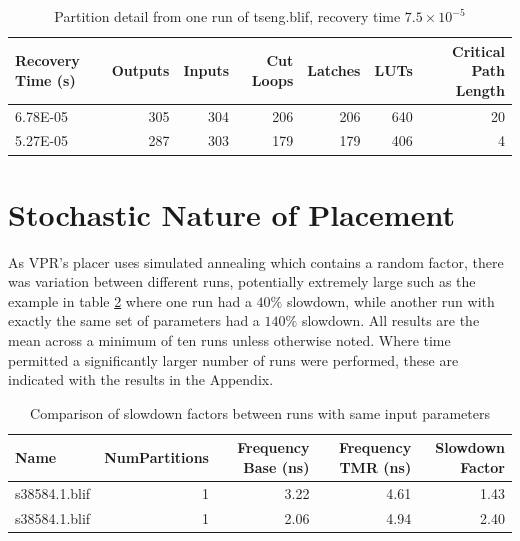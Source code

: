 \documentclass[12pt,final,oneside]{dwThesis} %
\begin{document}
   \begin{table}

      \begin{tabular}
         {lrrrrrr} \toprule Recovery Time (s) &
         Outputs & Inputs & Cut Loops & Latches & \glspl{LUT} & Critical
         Path Length\\
         \midrule 6.78E-05 & 305 & 304 & 206 & 206 & 640 &
         20\\
         5.27E-05 & 287 & 303 & 179 & 179 & 406 & 4\\
         \bottomrule

      \end{tabular}
      \caption{Partition detail from one run of tseng.blif,
         recovery time $7.5\times10^{-5}$}\label{tabSanityPartitions}

   \end{table}



   \section{Stochastic Nature of Placement}\label{stochastic}
   As \gls{VPR}'s placer uses
   simulated annealing which contains a random factor, there was variation
   between different runs, potentially extremely large such as the example in
   table \ref{tabStochastic} where one run had a $40\%$ slowdown, while another
   run with exactly the same set of parameters had a $140\%$ slowdown.
   All results are the mean across a minimum of ten runs unless otherwise noted.
   Where time permitted a significantly larger number of runs were performed, these are indicated with the results in the Appendix.

   \begin{table}

      \begin{tabular}
         {lrrrr} \toprule Name & NumPartitions &
         Frequency Base (ns) & Frequency TMR (ns) & Slowdown Factor\\
         \midrule
         s38584.1.blif &	1 & 3.22 & 4.61 & 1.43\\
         s38584.1.blif &	1 & 2.06 &
         4.94 & 2.40\\
         \bottomrule 
      \end{tabular}
      \caption{Comparison of
         slowdown factors between runs with same input
         parameters}\label{tabStochastic} 
   \end{table}
\end{document}

